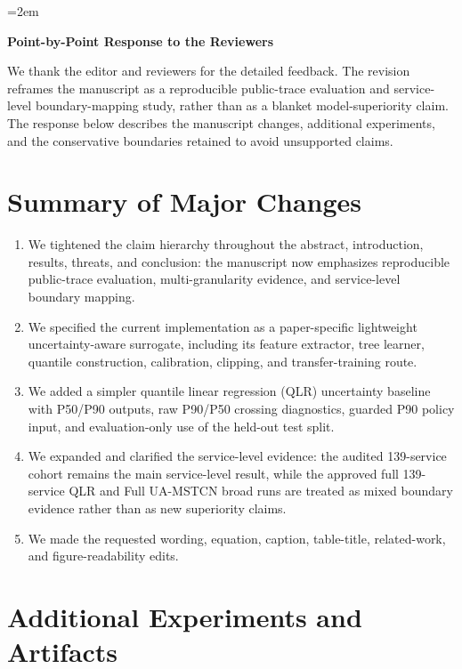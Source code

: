 \documentclass[11pt]{article}
\newcommand{\code}[1]{\texttt{\detokenize{#1}}}
\begin{document}
\emergencystretch=2em

\begin{center}
{\Large\bfseries Point-by-Point Response to the Reviewers}
\end{center}

We thank the editor and reviewers for the detailed feedback. The revision reframes the manuscript as a reproducible public-trace evaluation and service-level boundary-mapping study, rather than as a blanket model-superiority claim. The response below describes the manuscript changes, additional experiments, and the conservative boundaries retained to avoid unsupported claims.

\section*{Summary of Major Changes}

\begin{enumerate}[leftmargin=*]
\item We tightened the claim hierarchy throughout the abstract, introduction, results, threats, and conclusion: the manuscript now emphasizes reproducible public-trace evaluation, multi-granularity evidence, and service-level boundary mapping.
\item We specified the current \code{UA-MSTCN-Lite} implementation as a paper-specific lightweight uncertainty-aware surrogate, including its feature extractor, tree learner, quantile construction, calibration, clipping, and transfer-training route.
\item We added a simpler quantile linear regression (QLR) uncertainty baseline with P50/P90 outputs, raw P90/P50 crossing diagnostics, guarded P90 policy input, and evaluation-only use of the held-out test split.
\item We expanded and clarified the service-level evidence: the audited 139-service cohort remains the main service-level \code{UA-MSTCN-Lite} result, while the approved full 139-service QLR and Full UA-MSTCN broad runs are treated as mixed boundary evidence rather than as new superiority claims.
\item We made the requested wording, equation, caption, table-title, related-work, and figure-readability edits.
\end{enumerate}

\section*{Additional Experiments and Artifacts}
\end{document}
